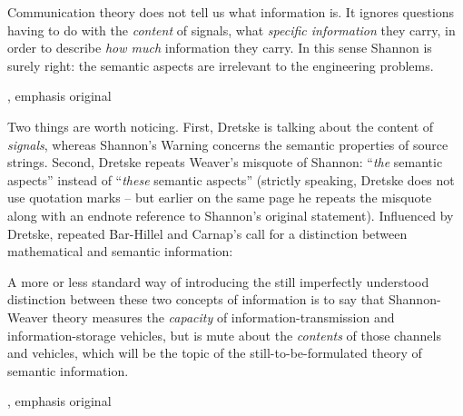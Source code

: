 \documentclass[12pt]{article}
\begin{document}
\begin{myquote}
Communication theory does not tell us what information is.
It ignores questions having to do with the \emph{content} of signals, what \emph{specific information} they carry, in order to describe \emph{how much} information they carry.
In this sense Shannon is surely right: the semantic aspects are irrelevant to the engineering problems.
\par\hspace*{\fill}\citet[41]{dretske1981knowledge}, emphasis original
\end{myquote}

\noindent Two things are worth noticing.
First, Dretske is talking about the content of \textit{signals}, whereas {\sc Shannon's Warning} concerns the semantic properties of source strings.
Second, Dretske repeats Weaver's misquote of Shannon: ``\textit{the} semantic aspects'' instead of ``\textit{these} semantic aspects'' (strictly speaking, Dretske does not use quotation marks -- but earlier on the same page he repeats the misquote along with an endnote reference to Shannon's original statement).
Influenced by Dretske, \citet{dennett1983intentional} repeated Bar-Hillel and Carnap's call for a distinction between mathematical and semantic information:

\begin{myquote}
A more or less standard way of introducing the still imperfectly understood distinction between these two concepts of information is to say that Shannon-Weaver theory measures the \emph{capacity} of information-transmission and information-storage vehicles, but is mute about the \emph{contents} of those channels and vehicles, which will be the topic of the still-to-be-formulated theory of semantic information.
\par\hspace*{\fill}\citet[344]{dennett1983intentional}, emphasis original
\end{myquote}
\end{document}
